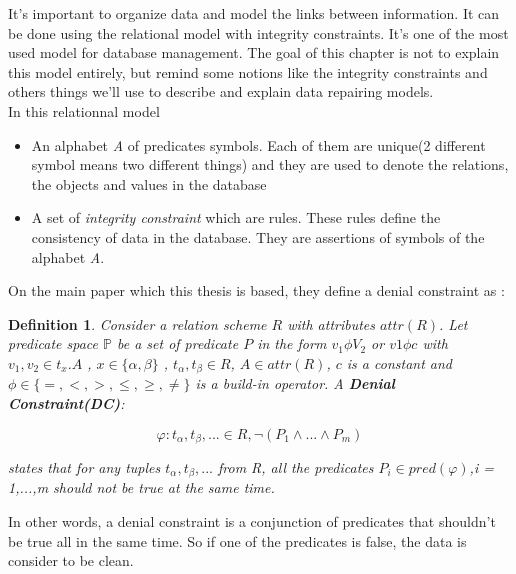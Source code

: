 \documentclass[letterpaper, 12pt]{report}
\newtheorem{mydef}{Definition}
\newcommand{\alinea}{
\hspace*{0.5cm}}
\begin{document}
\alinea It's important to organize data and model the links between information. It can be done using the relational model with integrity constraints. It's one of the most used model for database management. The goal of this chapter is not to explain this model entirely, but remind some notions like the integrity constraints and others things we'll use to describe and explain data repairing models.\\

In this relationnal model \cite{Integrity}
\begin{itemize}
\item An alphabet \emph{A} of predicates symbols. Each of them are unique(2 different symbol means two different things) and they are used to denote the relations, the objects and values in the database
\item  A set of \emph{integrity constraint}  which are rules. These rules define the consistency of data in the database. They are assertions of symbols of the alphabet \emph{A}. 
\end{itemize}

On the main paper which this thesis is based, they define a denial constraint as \cite{main}:
\begin{mydef}
Consider a relation scheme $R$ with attributes $attr(R)$. Let predicate space $\mathbb{P}$ be a set of predicate  $P$ in the form  $v_1 \phi V_2$ or $v1 \phi c$ with $v_1,v_2 \in t_x.A$ , $x \in \{\alpha,\beta\}$ , $t_\alpha,t_\beta \in R$, $A \in attr(R)$, $c$ is a constant and $\phi \in \{ =,<,>,\leq, \geq, \neq \}$ is a build-in operator.  A \textbf{Denial Constraint(DC)}:

$$\varphi : t_\alpha,t_\beta,... \in R, \neg(P_1 \wedge ... \wedge P_m)$$

states that for any tuples $t_\alpha,t_\beta,...$ from R, all the predicates $P_i \in pred(\varphi)$,i = 1,...,m should not be true at the same time.
\end{mydef}

In other words, a denial constraint is a conjunction of predicates that shouldn't be true all in the same time. So if one of the predicates is false, the data is consider to be clean.
%
\end{document}
